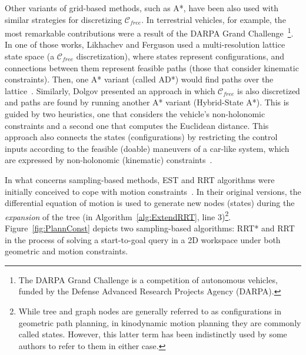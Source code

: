Other variants of grid-based methods, such as A*, have been also used with
similar strategies for discretizing $\mathcal{C}_{free}$. In terrestrial
vehicles, for example, the most remarkable contributions were a result of the
DARPA Grand Challenge~\cite{Thrun2006}\footnote{The DARPA Grand Challenge is a
competition of autonomous vehicles, funded by the Defense Advanced Research
Projects Agency (DARPA).}. In one of those works, Likhachev and Ferguson used a
multi-resolution lattice state space (a $\mathcal{C}_{free}$ discretization),
where states represent configurations, and connections between them represent
feasible paths (\ie those that consider kinematic constraints).
Then, one A* variant (called AD*) would find paths over the
lattice~\cite{Likhachev2009}. Similarly, Dolgov \etal presented an approach in
which $\mathcal{C}_{free}$ is also discretized and paths are found by running
another A* variant (Hybrid-State A*). This is guided by two heuristics, one that
considers the vehicle's non-holonomic constraints and a second one that computes
the Euclidean distance. This approach also connects the states (configurations)
by restricting the control inputs according to the feasible (doable) maneuvers
of a car-like system, which are expressed by non-holonomic (kinematic)
constraints~\cite{Dolgov2008,Dolgov2010}.


In what concerns sampling-based methods, \ac{EST} and \ac{RRT} algorithms were
initially conceived to cope with motion constraints~\cite{Hsu2002,LaValle2001}.
In their original versions, the differential equation of motion is used to
generate new nodes (states) during the \textit{expansion} of the tree (\eg in
Algorithm~\ref{alg:ExtendRRT}, line 3)\footnote{While tree and graph nodes are
generally referred to as configurations in geometric path planning, in
kinodynamic motion planning they are commonly called states. However, this
latter term has been indistinctly used by some authors to refer to them in
either case.}. Figure~\ref{fig:PlannConst} depicts two sampling-based
algorithms: \ac{RRT*} and \ac{RRT} in the process of solving a start-to-goal
query in a \ac{2D} workspace under both geometric and motion constraints.

